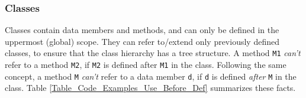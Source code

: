 \documentclass{article}
\begin{document}
\subsubsection{Classes}
\label{subsubsection_Classes}
Classes contain data members and methods,
and can only be defined in the uppermost (global) scope.
They can refer to/extend only previously defined classes,
to ensure that the class hierarchy has a tree structure.
A method \verb"M1" \textit{can't} refer to a method \verb"M2",
if \verb"M2" is defined after \verb"M1" in the class.
Following the same concept, %
a method \verb"M" \textit{can't} refer to a data member \verb"d",
if \verb"d" is defined \textit{after} \verb"M" in the class.
Table \ref{Table_Code_Examples_Use_Before_Def} summarizes these facts.
\end{document}
